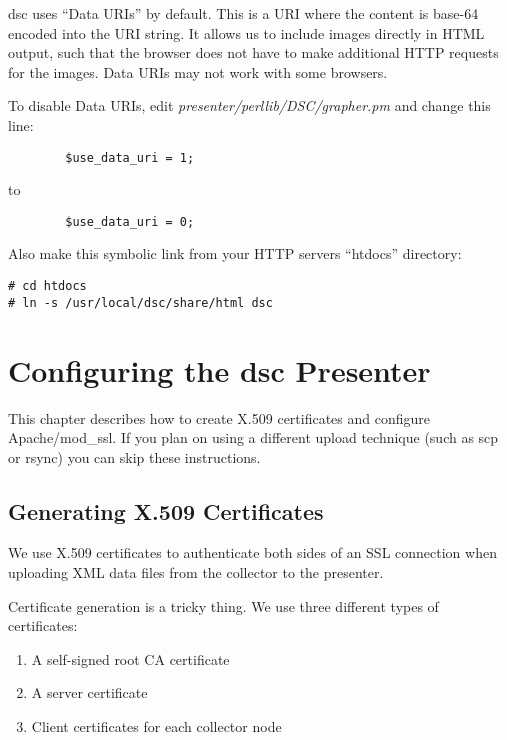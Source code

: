 \documentclass{report}
\def\dsc{{\sc dsc}}
\begin{document}
{\dsc} uses ``Data URIs'' by default.  This is a URI where the
content is base-64 encoded into the URI string.  It allows us
to include images directly in HTML output, such that the browser
does not have to make additional HTTP requests for the images.
Data URIs may not work with some browsers.

To disable Data URIs, edit {\em presenter/perllib/DSC/grapher.pm\/}
and change this line:

\begin{verbatim}
        $use_data_uri = 1;
\end{verbatim}

to

\begin{verbatim}
        $use_data_uri = 0;
\end{verbatim}

Also make this symbolic link from your HTTP servers ``htdocs'' directory:

\begin{verbatim}
# cd htdocs
# ln -s /usr/local/dsc/share/html dsc
\end{verbatim}




\chapter{Configuring the {\dsc} Presenter}

This chapter describes how to create X.509 certificates and configure
Apache/mod\_ssl.  If you plan on using a different upload
technique (such as scp or rsync) you can skip these instructions.

\section{Generating X.509 Certificates}

We use X.509 certificates to authenticate both sides
of an SSL connection when uploading XML data files from 
the collector to the presenter.

Certificate generation is a tricky thing.  We use three different
types of certificates:
\begin{enumerate}
\item A self-signed root CA certificate
\item A server certificate
\item Client certificates for each collector node
\end{enumerate}
\end{document}
